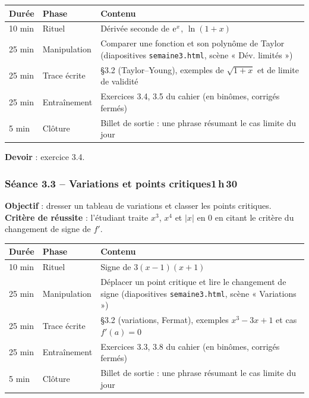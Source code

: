 \documentclass[10.5pt,a4paper]{article}
\newif\ifprof
\newcommand{\profonly}[1]{\ifprof #1\fi}
\begin{document}
\begin{longtable}{@{}p{1.1cm}p{2.4cm}p{12.4cm}@{}}
\toprule \textbf{Durée} & \textbf{Phase} & \textbf{Contenu}\\ \midrule\endhead
10 min & Rituel & Dérivée seconde de $\mathrm{e}^x$, $\ln(1+x)$\\
25 min & Manipulation & Comparer une fonction et son polynôme de Taylor (diapositives \texttt{semaine3.html}, scène « Dév. limités »)\\
25 min & Trace écrite & \S3.2 (Taylor--Young), exemples de $\sqrt{1+x}$ et de limite de validité\\
25 min & Entraînement & Exercices 3.4, 3.5 du cahier (en binômes, corrigés fermés)\\
5 min & Clôture & Billet de sortie : une phrase résumant le cas limite du jour\\ \bottomrule\end{longtable}\nopagebreak
\textbf{Devoir} : exercice 3.4.\profonly{ \textbf{Point de vigilance} : Insister : le DL n'est valable que près du point ($\sqrt{1+3}$ à l'ordre 2 est faux de $0{,}6$).}\par
{}\subsubsection*{\textcolor{marine}{Séance 3.3 -- Variations et points critiques}\hfill\normalfont\small\textcolor{ardoise}{1\,h\,30}}
\begin{objectif}\textbf{Objectif} : dresser un tableau de variations et classer les points critiques.\\\textbf{Critère de réussite} : l'étudiant traite $x^3$, $x^4$ et $|x|$ en $0$ en citant le critère du changement de signe de $f'$.\end{objectif}\nopagebreak
\begin{longtable}{@{}p{1.1cm}p{2.4cm}p{12.4cm}@{}}
\toprule \textbf{Durée} & \textbf{Phase} & \textbf{Contenu}\\ \midrule\endhead
10 min & Rituel & Signe de $3(x-1)(x+1)$\\
25 min & Manipulation & Déplacer un point critique et lire le changement de signe (diapositives \texttt{semaine3.html}, scène « Variations »)\\
25 min & Trace écrite & \S3.2 (variations, Fermat), exemples $x^3-3x+1$ et cas $f'(a)=0$\\
25 min & Entraînement & Exercices 3.3, 3.8 du cahier (en binômes, corrigés fermés)\\
5 min & Clôture & Billet de sortie : une phrase résumant le cas limite du jour\\ \bottomrule\end{longtable}\nopagebreak
\end{document}
